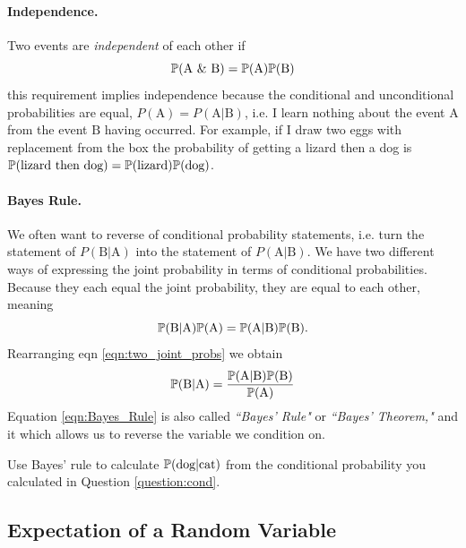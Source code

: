 \paragraph{Independence.}
Two events are \emph{independent} of each other if
\begin{equation}
\P(\textrm{A \& B}) = \P(\textrm{A}) \P(\textrm{B}) \label{eqn:basic_indie}
\end{equation}
this requirement implies independence because the conditional and
unconditional probabilities are equal, $P(\textrm{A}) = P(\textrm{A} | \textrm{B})$, i.e. I learn
nothing about the event $\textrm{A}$ from the event $\textrm{B}$ having occurred. 
For example, if I draw two eggs with replacement from the box the
probability of getting a lizard then a dog is $\P(\textrm{lizard then dog}) =
\P(\textrm{lizard}) \P(\textrm{dog})$. 


\paragraph{Bayes Rule.}
We often want to reverse of conditional probability statements,
i.e. turn the statement of $P(\textrm{B} | \textrm{A})$ into the statement of $P(\textrm{A} |
\textrm{B})$. 
We have two different ways of expressing the joint probability in terms of conditional probabilities. Because they each equal the joint probability, they are equal to each other, meaning
\begin{equation}
\P(\textrm{B} | \textrm{A}) \P(\textrm{A}) =  \P(\textrm{A} | \textrm{B}) \P(\textrm{B}) . \label{eqn:two_joint_probs}
 \end{equation}
Rearranging eqn \eqref{eqn:two_joint_probs} we obtain 
\begin{equation}
\P(\textrm{B} | \textrm{A}) =  \frac{\P(\textrm{A} | \textrm{B}) \P(\textrm{B}) }{\P(\textrm{A})} \label{eqn:Bayes_Rule}
 \end{equation}
Equation \eqref{eqn:Bayes_Rule} is also called \emph{``Bayes' Rule"} or \emph{``Bayes' Theorem,"} and it  which allows us to reverse the variable we
condition on. 
\begin{question}{}
Use Bayes' rule to calculate $\P(\textrm{dog} | \textrm{cat})$ from
the conditional probability you calculated in Question
\ref{question:cond}.\\
 \end{question}


\subsection{Expectation of a Random Variable}\label{appendix:expectation}

